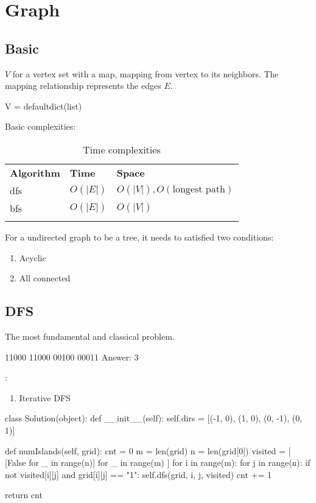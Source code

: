 \chapter{Graph}

\section{Basic}
 $V$ for a vertex set with a map, mapping from vertex to its neighbors. The mapping relationship represents the edges $E$.
\begin{python}
V = defaultdict(list)
\end{python}

 Basic complexities:

\begin{table}

\begin{tabular}{lll}
\hline\noalign{\smallskip}
\textbf{Algorithm} & \textbf{Time}  & \textbf{Space}\\
\noalign{\smallskip}\hline\noalign{\smallskip}
dfs & $O(|E|)$ & $O(|V|), O(\text{longest path})$ \\
bfs & $O(|E|)$ & $O(|V|)$ \\
\noalign{\smallskip}\hline\noalign{\smallskip}
\end{tabular}

\caption{Time complexities}
\end{table}

 For a undirected graph to be a tree, it needs to satisfied two conditions:
\begin{enumerate}
\item Acyclic
\item All connected
\end{enumerate}
\section{DFS}
 The most fundamental and classical problem.
\begin{python}
11000
11000
00100
00011
Answer: 3
\end{python}
:
\begin{enumerate}
\item Iterative DFS
\end{enumerate}
\begin{python}
class Solution(object):
  def __init__(self):
    self.dirs = [(-1, 0), (1, 0), (0, -1), (0, 1)]

  def numIslands(self, grid):
    cnt = 0
    m = len(grid)
    n = len(grid[0])
    visited = [
      [False for _ in range(n)]
      for _ in range(m)
    ]
    for i in range(m):
      for j in range(n):
        if not visited[i][j] and grid[i][j] == "1":
          self.dfs(grid, i, j, visited)
          cnt += 1

    return cnt
\end{python}

